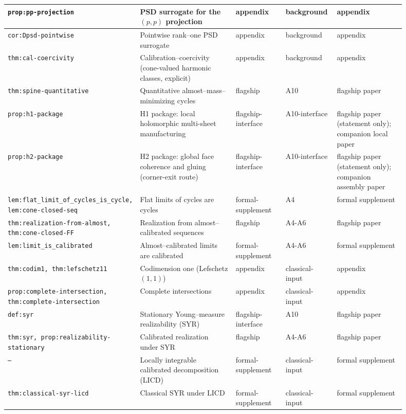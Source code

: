 \documentclass[11pt]{article}
\numberwithin{equation}{section}  %
\theoremstyle{plain}
\theoremstyle{definition}
\theoremstyle{remark}
\begin{document}
\begin{longtable}{|p{0.18\linewidth}|p{0.27\linewidth}|p{0.13\linewidth}|p{0.13\linewidth}|p{0.19\linewidth}|}
\texttt{prop:pp-projection} & PSD surrogate for the $(p,p)$ projection & appendix & background & appendix \\ \hline
\texttt{cor:Dpsd-pointwise} & Pointwise rank--one PSD surrogate & appendix & background & appendix \\ \hline
\texttt{thm:cal-coercivity} & Calibration--coercivity (cone-valued harmonic classes, explicit) & appendix & background & appendix \\ \hline
\texttt{thm:spine-quantitative} & Quantitative almost--mass--minimizing cycles & flagship & A10 & flagship paper \\ \hline
\texttt{prop:h1-package} & H1 package: local holomorphic multi-sheet manufacturing & flagship-interface & A10-interface & flagship paper (statement only); companion local paper \\ \hline
\texttt{prop:h2-package} & H2 package: global face coherence and gluing (corner-exit route) & flagship-interface & A10-interface & flagship paper (statement only); companion assembly paper \\ \hline
\texttt{lem:flat\_limit\_of\_cycles\_is\_cycle, lem:cone-closed-seq} & Flat limits of cycles are cycles & formal-supplement & A4 & formal supplement \\ \hline
\texttt{thm:realization-from-almost, thm:cone-closed-FF} & Realization from almost--calibrated sequences & flagship & A4-A6 & flagship paper \\ \hline
\texttt{lem:limit\_is\_calibrated} & Almost--calibrated limits are calibrated & formal-supplement & A4-A6 & formal supplement \\ \hline
\texttt{thm:codim1, thm:lefschetz11} & Codimension one (Lefschetz $(1,1)$) & appendix & classical-input & appendix \\ \hline
\texttt{prop:complete-intersection, thm:complete-intersection} & Complete intersections & appendix & classical-input & appendix \\ \hline
\texttt{def:syr} & Stationary Young--measure realizability (SYR) & flagship-interface & A10 & flagship paper \\ \hline
\texttt{thm:syr, prop:realizability-stationary} & Calibrated realization under SYR & flagship & A4-A6 & flagship paper \\ \hline
\texttt{--} & Locally integrable calibrated decomposition (LICD) & formal-supplement & classical-input & formal supplement \\ \hline
\texttt{thm:classical-syr-licd} & Classical SYR under LICD & formal-supplement & classical-input & formal supplement \\ \hline

\end{longtable}
\end{document}
